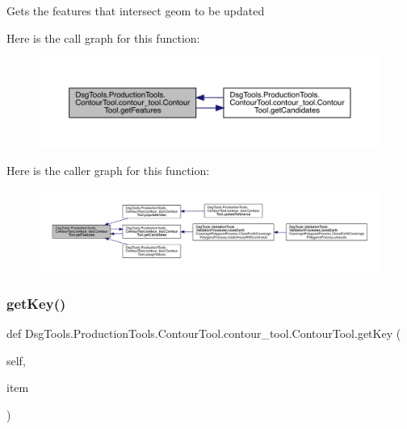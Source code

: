 \begin{DoxyVerb}Gets the features that intersect geom to be updated
\end{DoxyVerb}
 Here is the call graph for this function\+:
\nopagebreak
\begin{figure}[H]
\begin{center}
\leavevmode
\includegraphics[width=350pt]{class_dsg_tools_1_1_production_tools_1_1_contour_tool_1_1contour__tool_1_1_contour_tool_ae3a9e1379fcfb2a84ffeba6d7c24853b_cgraph}
\end{center}
\end{figure}
Here is the caller graph for this function\+:
\nopagebreak
\begin{figure}[H]
\begin{center}
\leavevmode
\includegraphics[width=350pt]{class_dsg_tools_1_1_production_tools_1_1_contour_tool_1_1contour__tool_1_1_contour_tool_ae3a9e1379fcfb2a84ffeba6d7c24853b_icgraph}
\end{center}
\end{figure}
\mbox{\label{class_dsg_tools_1_1_production_tools_1_1_contour_tool_1_1contour__tool_1_1_contour_tool_aa6752b46896069093a97842ed50b0672}} 
\subsubsection{\texorpdfstring{get\+Key()}{getKey()}}
{\footnotesize\ttfamily def Dsg\+Tools.\+Production\+Tools.\+Contour\+Tool.\+contour\+\_\+tool.\+Contour\+Tool.\+get\+Key (\begin{DoxyParamCaption}\item[{}]{self,  }\item[{}]{item }\end{DoxyParamCaption})}

